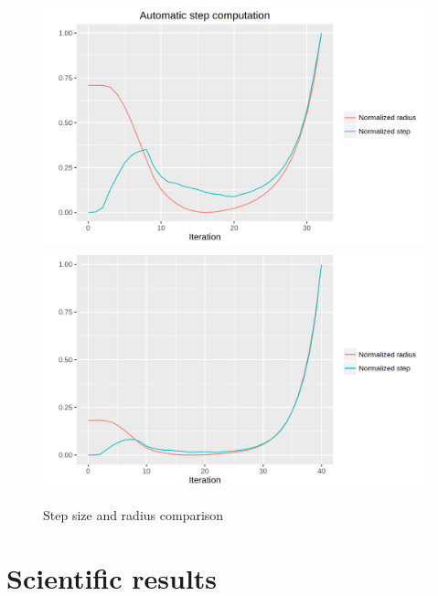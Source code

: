 \begin{figure}[bth]
	\myfloatalign
	{\label{fig:example-b}%
		\includegraphics[width=.8\linewidth]{gfx/stepradius1}} \\
	{\includegraphics[width=.8\linewidth]{gfx/stepradius2}}
	\caption[Step size and radius comparison]{Step size and radius comparison}\label{fig:step}
\end{figure}


\section{Scientific results}